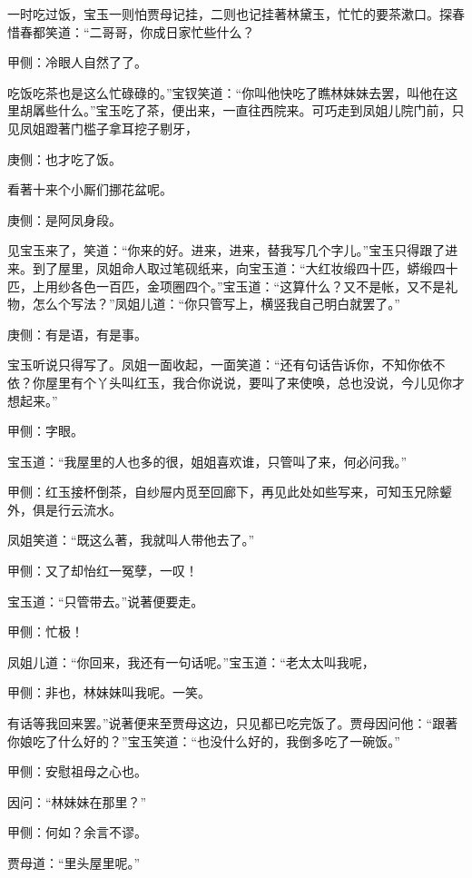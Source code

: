 \begin{parag}
    一时吃过饭，宝玉一则怕贾母记挂，二则也记挂著林黛玉，忙忙的要茶漱口。探春惜春都笑道：“二哥哥，你成日家忙些什么？\begin{note}甲侧：冷眼人自然了了。\end{note}吃饭吃茶也是这么忙碌碌的。”宝钗笑道：“你叫他快吃了瞧林妹妹去罢，叫他在这里胡羼些什么。”宝玉吃了茶，便出来，一直往西院来。可巧走到凤姐儿院门前，只见凤姐蹬著门槛子拿耳挖子剔牙，\begin{note}庚侧：也才吃了饭。\end{note}看著十来个小厮们挪花盆呢。\begin{note}庚侧：是阿凤身段。\end{note}见宝玉来了，笑道：“你来的好。进来，进来，替我写几个字儿。”宝玉只得跟了进来。到了屋里，凤姐命人取过笔砚纸来，向宝玉道：“大红妆缎四十匹，蟒缎四十匹，上用纱各色一百匹，金项圈四个。”宝玉道：“这算什么？又不是帐，又不是礼物，怎么个写法？”凤姐儿道：“你只管写上，横竖我自己明白就罢了。”\begin{note}庚侧：有是语，有是事。\end{note}宝玉听说只得写了。凤姐一面收起，一面笑道：“还有句话告诉你，不知你依不依？你屋里有个丫头叫红玉，我合你说说，要叫了来使唤，总也没说，今儿见你才想起来。”\begin{note}甲侧：字眼。\end{note}宝玉道：“我屋里的人也多的很，姐姐喜欢谁，只管叫了来，何必问我。”\begin{note}甲侧：红玉接杯倒茶，自纱屉内觅至回廊下，再见此处如些写来，可知玉兄除颦外，俱是行云流水。\end{note}凤姐笑道：“既这么著，我就叫人带他去了。”\begin{note}甲侧：又了却怡红一冤孽，一叹！\end{note}宝玉道：“只管带去。”说著便要走。\begin{note}甲侧：忙极！\end{note}凤姐儿道：“你回来，我还有一句话呢。”宝玉道：“老太太叫我呢，\begin{note}甲侧：非也，林妹妹叫我呢。一笑。\end{note}有话等我回来罢。”说著便来至贾母这边，只见都已吃完饭了。贾母因问他：“跟著你娘吃了什么好的？”宝玉笑道：“也没什么好的，我倒多吃了一碗饭。”\begin{note}甲侧：安慰祖母之心也。\end{note}因问：“林妹妹在那里？”\begin{note}甲侧：何如？余言不谬。\end{note}贾母道：“里头屋里呢。”
\end{parag}


